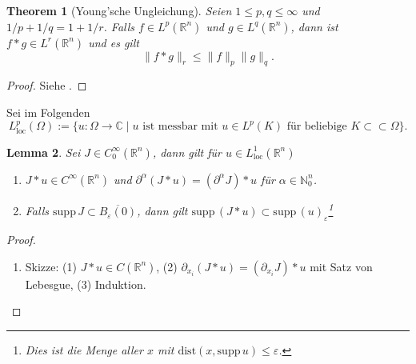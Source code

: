 \documentclass[
paper=a4,
bibtotocnumbered,
liststotocnumbered,
tablecaptionabove,
pointlessnumbers,
twoside,
openright,
10pt
]
{report}
\newcommand{\supp}{\mathrm{supp}\,}
\newcommand{\dist}{\mathrm{dist}}
\let\epsilon\varepsilon
\newtheorem{thm}{Theorem}[chapter]
\newtheorem{lem}[thm]{Lemma}
\theoremstyle{definition}
\numberwithin{equation}{chapter}
\begin{document}
\begin{thm}[Young'sche Ungleichung]\label{thm4}
Seien $1\leq p,q\leq\infty$ und $1/p+1/q=1+1/r$. Falls $f\in L^p(\mathbb{R}^n)$ und $g\in L^q(\mathbb{R}^n)$, dann ist $f\ast g\in L^r(\mathbb{R}^n)$ und es gilt
\begin{equation}
\|f\ast g\|_r\leq \|f\|_p\|g\|_q.
\end{equation}
\end{thm}
\begin{proof}
Siehe \cite{AF}.
\end{proof}

Sei im Folgenden
\begin{equation}
L_\mathrm{loc}^p(\Omega):=\{u:\Omega\rightarrow\mathbb{C}\mid u\text{ ist messbar mit }u\in L^p(K)\text{ für beliebige }K\subset\subset\Omega\}.
\end{equation}

\begin{lem}\label{lem5}
Sei $J\in C_0^\infty(\mathbb{R}^n)$, dann gilt für $u\in L_\mathrm{loc}^1(\mathbb{R}^n)$
\begin{enumerate}[\bf (a)]
\item $J\ast u\in C^\infty(\mathbb{R}^n)$ und $\partial^\alpha(J\ast u)=(\partial^\alpha J)\ast u$ für $\alpha\in\mathbb{N}_0^n$.
\item Falls $\supp J\subset \overline{B_\epsilon(0)}$, dann gilt $\supp (J\ast u)\subset\supp (u)_\epsilon$\footnote{Dies ist die Menge aller $x$ mit $\dist(x,\supp u) \leq \epsilon$.}
\end{enumerate}
\end{lem}
\begin{proof}
\begin{enumerate}[\bf (a)]
\item Skizze: (1) $J\ast u\in C(\mathbb{R}^n)$, (2) $\partial_{x_i}(J\ast u)=(\partial_{x_i} J)\ast u$ mit Satz von Lebesgue, (3) Induktion.
\end{enumerate}
\end{proof}
\end{document}
